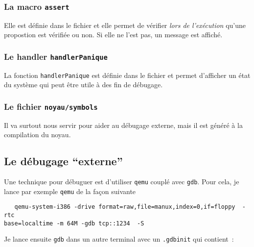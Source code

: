 \subsubsection{La macro {\tt assert}}

   Elle est définie dans le fichier 
et elle permet de vérifier {\em lors de l'exécution} qu'une propostion
est vérifiée ou non. Si elle ne l'est pas, un message est affiché.

%
\subsubsection{Le handler {\tt handlerPanique}}

   La fonction {\tt handlerPanique} est définie dans le fichier
 et permet d'afficher un état du
système qui peut être utile à des fin de débugage.

%
\subsubsection{Le fichier {\tt noyau/symbols}}

   Il va surtout nous servir pour aider au débugage externe, mais il
est généré à la compilation du noyau.
 
%
\subsection{Le débugage ``externe''}
\label{subsection:debugage_externe}

   Une technique pour débuguer est d'utiliser {\tt qemu} couplé avec
{\tt gdb}. Pour cela, je lance par exemple {\tt qemu} de la façon suivante

\begin{lstlisting}
   qemu-system-i386 -drive format=raw,file=manux,index=0,if=floppy  -rtc
base=localtime -m 64M -gdb tcp::1234  -S 
\end{lstlisting}

   Je lance ensuite {\tt gdb} dans un autre terminal avec un
\lstinline!.gdbinit! qui contient~:

